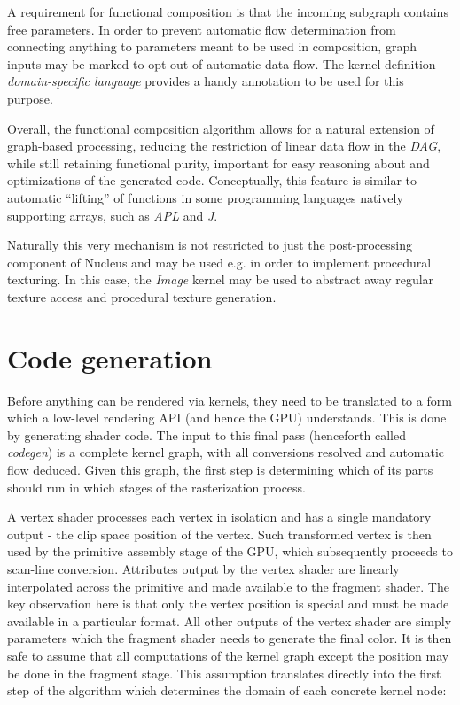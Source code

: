 A requirement for functional composition is that the incoming subgraph contains free parameters. In order to prevent automatic flow determination from connecting anything to parameters meant to be used in composition, graph inputs may be marked to opt-out of automatic data flow. The kernel definition \emph{domain-specific language} provides a handy annotation to be used for this purpose.


Overall, the functional composition algorithm allows for a natural extension of graph-based processing, reducing the restriction of linear data flow in the \emph{DAG}, while still retaining functional purity, important for easy reasoning about and optimizations of the generated code. Conceptually, this feature is similar to automatic ``lifting'' of functions in some programming languages natively supporting arrays, such as \emph{APL} and \emph{J}.

Naturally this very mechanism is not restricted to just the post-processing component of Nucleus and may be used e.g. in order to implement procedural texturing. In this case, the \emph{Image} kernel may be used to abstract away regular texture access and procedural texture generation.
	
\section{Code generation}
\label{sec:codegen}

Before anything can be rendered via kernels, they need to be translated to a form which a low-level rendering API (and hence the GPU) understands. This is done by generating shader code. The input to this final pass (henceforth called \emph{codegen}) is a complete kernel graph, with all conversions resolved and automatic flow deduced. Given this graph, the first step is determining which of its parts should run in which stages of the rasterization process.

A vertex shader processes each vertex in isolation and has a single mandatory output - the clip space position of the vertex. Such transformed vertex is then used by the primitive assembly stage of the GPU, which subsequently proceeds to scan-line conversion. Attributes output by the vertex shader are linearly interpolated across the primitive and made available to the fragment shader. The key observation here is that only the vertex position is special and must be made available in a particular format. All other outputs of the vertex shader are simply parameters which the fragment shader needs to generate the final color. It is then safe to assume that all computations of the kernel graph except the position may be done in the fragment stage. This assumption translates directly into the first step of the algorithm which determines the domain of each concrete kernel node:

